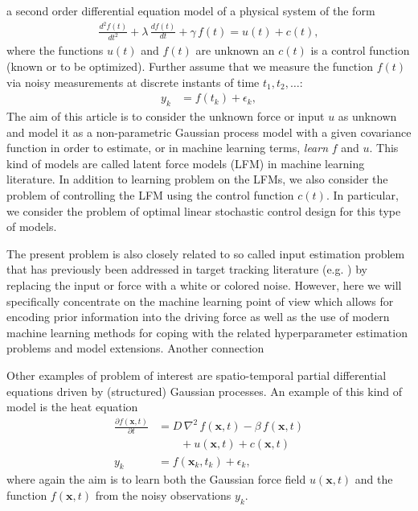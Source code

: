 \documentclass[journal]{IEEEtran}
\begin{document}
 a second order differential equation model of a physical system of the form
%
\begin{equation}
\begin{split}
  \frac{d^{2}f(t)}{dt^{2}} + \lambda \, \frac{df(t)}{dt} + \gamma \, f(t) = u(t) + c(t),
\end{split}
\label{eq:sde0}
\end{equation}
%
where the functions $u(t)$ and $f(t)$ are unknown an $c(t)$ is a control function (known or to be optimized). Further assume that we measure the function $f(t)$ via noisy measurements at discrete instants of time $t_1,t_2,\ldots$:
%
\begin{equation}
\begin{split}
  y_k &= f(t_k) + \epsilon_k,
\end{split}
\end{equation}
%
The aim of this article is to consider the unknown force or input $u$ as unknown and model it as a non-parametric Gaussian process model \cite{Rasmussen+Williams:2006} with a given covariance function in order to estimate, or in machine learning terms, {\em learn} $f$ and $u$. This kind of models are called latent force models (LFM) \cite{Alvarez+Luengo+Lawrence:2009,Alvarez:2010,Alvarez+Luengo+Lawrence:2013,Hartikainen+Sarkka:2011,Hartikainen+Seppanen+Sarkka:2012} in machine learning literature. In addition to learning problem on the LFMs, we also consider the problem of controlling the LFM using the control function $c(t)$. In particular, we consider the problem of optimal linear stochastic control design for this type of models.

The present problem is also closely related to so called input estimation problem that has previously been addressed in target tracking literature (e.g. \cite{Bar-Shalom+Li+Kirubarajan:2001}) by replacing the input or force with a white or colored noise. However, here we will specifically concentrate on the machine learning point of view which allows for encoding prior information into the driving force as well as the use of modern machine learning methods for coping with the related hyperparameter estimation problems and model extensions. Another connection 

Other examples of problem of interest are spatio-temporal partial differential equations driven by (structured) Gaussian processes. An example of this kind of model is the heat equation
%
\begin{equation}
\begin{split}
  \frac{\partial f(\mathbf{x},t)}{\partial t} &=
  D \, \nabla^2 \, f(\mathbf{x},t) - \beta \, f(\mathbf{x},t) \\
  &\qquad + u(\mathbf{x},t) + c(\mathbf{x},t) \\
  y_k &= f(\mathbf{x}_k,t_k) + \epsilon_k,
\end{split}
\label{eq:spde0}
\end{equation}
%
where again the aim is to learn both the Gaussian force field $u(\mathbf{x},t)$ and the function $f(\mathbf{x},t)$ from the noisy observations $y_k$. 
\end{document}
